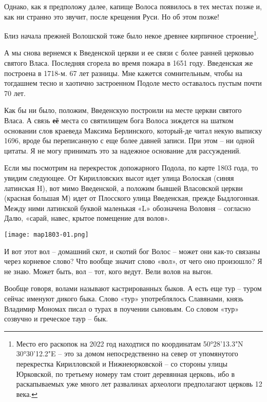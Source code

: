 \documentclass[a5paper,11pt,openany]{article}
\begin{document}
   Однако, как я предположу далее, капище Волоса появилось в тех местах позже и, как ни странно это звучит, после крещения Руси. Но об этом позже!

  Близ начала прежней Волошской тоже было некое древнее кирпичное строение\footnote{Место его раскопок на 2022 год находтися по координатам
50°28'13.3"N 30°30'12.2"E – это за домом непосредственно на север от упомянутого перекрестка Кирилловской и Нижнеюрковской – со стороны улицы Юрковской, по третьему номеру там стоит деревянная церковь, ибо в раскапываемых уже много лет развалинах археологи предполагают церковь 12 века.}. 

 А мы снова вернемся к Введенской церкви и ее связи с более ранней церковью святого Власа. Последняя сгорела во время пожара в 1651 году. Введенская же построена в 1718-м. 67 лет разницы. Мне кажется сомнительным, чтобы на тогдашнем тесно и хаотично застроенном Подоле место оставалось пустым почти 70 лет. 

 Как бы ни было, положим, Введенскую построили на месте церкви святого Власа. А связь \textbf{её} места со святилищем бога Волоса зиждется на шатком основании слов краеведа Максима Берлинского, который-де читал некую выписку 1696, вроде бы переписанную с еще более давней записи. При этом – ни одной цитаты. Я не могу принимать это за надежное основание для рассуждений.

Если мы посмотрим на перекресток допожарного Подола, по карте 1803 года, то увидим следующее. От Кирилловских высот идет улица Волоская (синяя латинская H), вот мимо Введенской, а положим бывшей Власовской церкви (красная большая М) идет от Плосского улица Введенская, прежде Быдлогонная. Между ними латинской буквой маленькая «L» обозначена Воловня – согласно Далю, «сарай, навес, крытое помещение для волов».

\begin{center}
\texttt{[image: map1803-01.png]}
\end{center}


    И вот этот вол – домашний скот, и скотий бог Волос – может они как-то связаны через корневое слово? Что вообще значит слово «вол», от чего оно произошло? Я не знаю. Может быть, вол – тот, кого ведут. Вели волов на выгон.

   Вообще говоря, волами называют кастрированных быков. А есть еще тур – туром сейчас именуют дикого быка. Слово «тур» употреблялось Славянами, князь Владимир Мономах писал о турах в поучении сыновьям. Со словом «тур» созвучно и греческое таур – бык.
\end{document}
